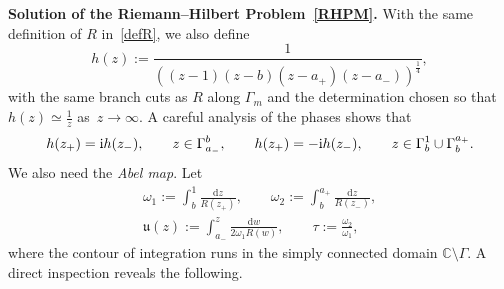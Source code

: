 \documentclass[pdftex]{sigma}
\numberwithin{equation}{section}
\theoremstyle{definition}
\def\Abel{\mathfrak u}
\def\le{\left}
\def\ri{\right}
\def \d{{\mathrm d}}
\def\be{\begin{equation}}
\def\ee{\end{equation}}
\def\C{{\mathbb C}}
\begin{document}
{\bf Solution of the Riemann--Hilbert Problem~\ref{RHPM}.}
With the same definition of $R$ in~\eqref{defR}, we also define
\be
h(z):= \frac 1 {\le((z-1)(z-b)(z-a_+)(z-a_-)\ri)^\frac 1 4},
\label{defh}
\ee
with the same branch cuts as $R$ along $\Gamma_m$ and the determination chosen so that $h(z) \simeq \frac 1 z $ as~${z\to \infty}$.
A careful analysis of the phases shows that
\begin{gather}
\label{hjumps}
h(z_+) ={\rm i} h(z_-),\qquad z\in \Gamma_{a_-}^b,\qquad
h(z_+) =-{\rm i} h(z_-), \qquad z\in \Gamma_b^1\cup \Gamma_b^{a_+}.
\end{gather}
We also need the \emph{Abel map}. Let
\begin{gather}
\label{defomega12}
\omega_1:= \int_b^1 \frac {\d z}{R(z_+)}, \qquad \omega_2:= \int_b^{a_+} \frac {\d z}{R(z_-)},\\
\label{defAbel}
\Abel(z):= \int_{a_-}^z \frac {\d w}{2\omega_1 R(w)}, \qquad \tau:= \frac {\omega_2}{\omega_1},
\end{gather}
where the contour of integration runs in the simply connected domain $\C\setminus \Gamma $.
A direct inspection reveals the following.
\end{document}
